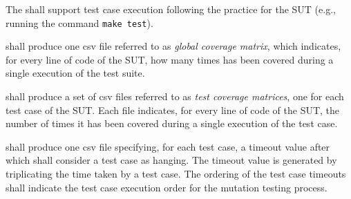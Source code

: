 
\RQ{} The \FAQAS shall support test case execution following the practice for the SUT (e.g., running the command \texttt{make test}).



\RQ{} \FAQAS shall produce one csv file referred to as \emph{global coverage matrix}, which indicates, for every line of code of the SUT, 
how many times has been covered during a single execution of the test suite.

\RQ{} \FAQAS shall produce a set of csv files referred to as \emph{test coverage matrices}, one for each test case of the SUT. Each file indicates, for every line of code of the SUT, the number of times it has been covered during a single execution of the test case.

\RQ{} \FAQAS shall produce one csv file specifying, for each test case, a timeout value after which \FAQAS shall consider a test case as hanging. The timeout value is generated by triplicating the time taken by a test case. The ordering of the test case timeouts shall indicate the test case execution order for the mutation testing process.



